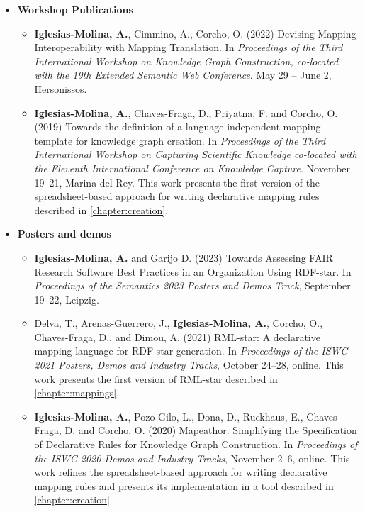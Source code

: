 \begin{itemize}
    \item \textbf{Workshop Publications}
    \begin{itemize}
        \item \textbf{Iglesias-Molina, A.}, Cimmino, A., Corcho, O. (2022) Devising Mapping Interoperability with Mapping Translation. In \textit{Proceedings of the Third International Workshop on Knowledge Graph Construction, co-located with the 19th Extended Semantic Web Conference}. May 29 -- June 2, Hersonissos. 
        
        \item \textbf{Iglesias-Molina, A.}, Chaves-Fraga, D., Priyatna, F. and Corcho, O. (2019) Towards the definition of a language-independent mapping template for knowledge graph creation. In \textit{Proceedings of the Third International Workshop on Capturing Scientific Knowledge co-located with the Eleventh International Conference on Knowledge Capture}. November 19--21, Marina del Rey. This work presents the first version of the spreadsheet-based approach for writing declarative mapping rules described in \cref{chapter:creation}.
    \end{itemize}
\end{itemize}

\begin{itemize}
    \item \textbf{Posters and demos}
    \begin{itemize}
        \item \textbf{Iglesias-Molina, A.} and Garijo D. (2023) Towards Assessing FAIR Research Software Best Practices in an Organization Using RDF-star. In \textit{Proceedings of the Semantics 2023 Posters and Demos Track}, September 19--22, Leipzig.
        
        \item Delva, T., Arenas-Guerrero, J., \textbf{Iglesias-Molina, A.}, Corcho, O., Chaves-Fraga, D., and Dimou, A. (2021) RML-star: A declarative mapping language for RDF-star generation. In \textit{Proceedings of the ISWC 2021 Posters, Demos and Industry Tracks}, October 24--28, online. This work presents the first version of RML-star described in \cref{chapter:mappings}.
    
        \item \textbf{Iglesias-Molina, A.}, Pozo-Gilo, L., Dona, D., Ruckhaus, E., Chaves-Fraga, D. and Corcho, O. (2020) Mapeathor: Simplifying the Specification of Declarative Rules for Knowledge Graph Construction. In \textit{Proceedings of the ISWC 2020 Demos and Industry Tracks}, November 2--6, online. This work refines the spreadsheet-based approach for writing declarative mapping rules and presents its implementation in a tool described in \cref{chapter:creation}.
    \end{itemize}
\end{itemize}


